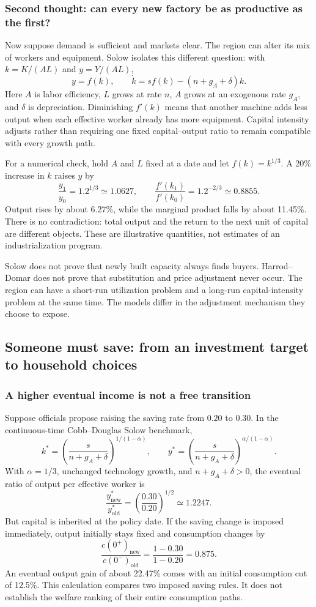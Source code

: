 \subsubsection{Second thought: can every new factory be as productive as the first?}

Now suppose demand is sufficient and markets clear. The region can alter
its mix of workers and equipment. Solow isolates this different question:
with $k=K/(AL)$ and $y=Y/(AL)$,
\[
y=f(k),\qquad \dot k=sf(k)-(n+g_A+\delta)k.
\]
Here $A$ is labor efficiency, $L$ grows at rate $n$, $A$ grows at an
exogenous rate $g_A$, and $\delta$ is depreciation. Diminishing $f'(k)$ means
that another machine adds less output when each effective worker already
has more equipment. Capital intensity adjusts rather than requiring one
fixed capital--output ratio to remain compatible with every growth path.

For a numerical check, hold $A$ and $L$ fixed at a date and let
$f(k)=k^{1/3}$. A 20\% increase in $k$ raises $y$ by
\[
\frac{y_1}{y_0}=1.2^{1/3}\simeq1.0627,
\qquad
\frac{f'(k_1)}{f'(k_0)}=1.2^{-2/3}\simeq0.8855.
\]
Output rises by about 6.27\%, while the marginal product falls by about
11.45\%. There is no contradiction: total output and the return to the next
unit of capital are different objects. These are illustrative quantities,
not estimates of an industrialization program.

Solow does not prove that newly built capacity always finds buyers.
Harrod--Domar does not prove that substitution and price adjustment never
occur. The region can have a short-run utilization problem and a long-run
capital-intensity problem at the same time. The models differ in the
adjustment mechanism they choose to expose.

\subsection{Someone must save: from an investment target to household choices}

\subsubsection{A higher eventual income is not a free transition}

Suppose officials propose raising the saving rate from $0.20$ to $0.30$.
In the continuous-time Cobb--Douglas Solow benchmark,
\[
k^*=\left(\frac{s}{n+g_A+\delta}\right)^{1/(1-\alpha)},
\qquad
y^*=\left(\frac{s}{n+g_A+\delta}\right)^{\alpha/(1-\alpha)}.
\]
With $\alpha=1/3$, unchanged technology growth, and
$n+g_A+\delta>0$, the eventual ratio of output per effective worker is
\[
\frac{y^*_{\mathrm{new}}}{y^*_{\mathrm{old}}}
=\left(\frac{0.30}{0.20}\right)^{1/2}\simeq1.2247.
\]
But capital is inherited at the policy date. If the saving change is imposed
immediately, output initially stays fixed and consumption changes by
\[
\frac{c(0^+)_{\mathrm{new}}}{c(0^-)_{\mathrm{old}}}
=\frac{1-0.30}{1-0.20}=0.875.
\]
An eventual output gain of about 22.47\% comes with an initial consumption
cut of 12.5\%. This calculation compares two imposed saving rules. It does
not establish the welfare ranking of their entire consumption paths.

